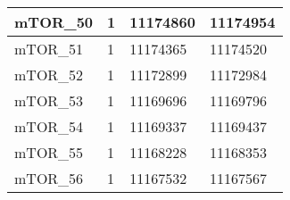 \begin{longtable}{| p{} | C{.10\textwidth} | C{.35\textwidth} | C{.35\textwidth} |}
mTOR\_50                & 1            & 11174860              & 11174954            \\ \hline
mTOR\_51                & 1            & 11174365              & 11174520            \\ \hline
mTOR\_52                & 1            & 11172899              & 11172984            \\ \hline
mTOR\_53                & 1            & 11169696              & 11169796            \\ \hline
mTOR\_54                & 1            & 11169337              & 11169437            \\ \hline
mTOR\_55                & 1            & 11168228              & 11168353            \\ \hline
mTOR\_56                & 1            & 11167532              & 11167567            \\ \hline
\end{longtable}

